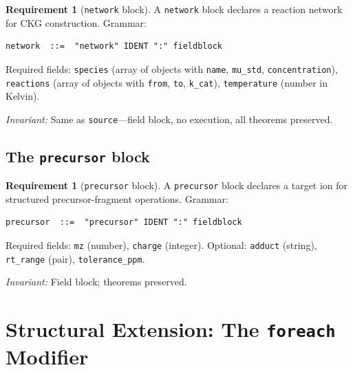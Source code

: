 \documentclass[11pt,a4paper]{article}
\theoremstyle{planstyle}
\theoremstyle{definition}
\newtheorem{requirement}[theorem]{Requirement}
\theoremstyle{remark}
\newcommand{\shk}[1]{\texttt{#1}}
\begin{document}
\begin{requirement}[\texttt{network} block]
\label{req:network}
A \shk{network} block declares a reaction network for CKG construction.
Grammar:
\begin{lstlisting}
network  ::=  "network" IDENT ":" fieldblock
\end{lstlisting}
Required fields: \shk{species} (array of objects with \shk{name},
\shk{mu\_std}, \shk{concentration}), \shk{reactions} (array of objects
with \shk{from}, \shk{to}, \shk{k\_cat}), \shk{temperature} (number
in Kelvin).

\emph{Invariant:} Same as \shk{source}---field block, no execution,
all theorems preserved.
\end{requirement}

\subsection{The \texttt{precursor} block}

\begin{requirement}[\texttt{precursor} block]
\label{req:precursor}
A \shk{precursor} block declares a target ion for structured
precursor-fragment operations.
Grammar:
\begin{lstlisting}
precursor  ::=  "precursor" IDENT ":" fieldblock
\end{lstlisting}
Required fields: \shk{mz} (number), \shk{charge} (integer). Optional:
\shk{adduct} (string), \shk{rt\_range} (pair), \shk{tolerance\_ppm}.

\emph{Invariant:} Field block; theorems preserved.
\end{requirement}

\section{Structural Extension: The \texttt{foreach} Modifier}
\label{sec:foreach}
\end{document}
